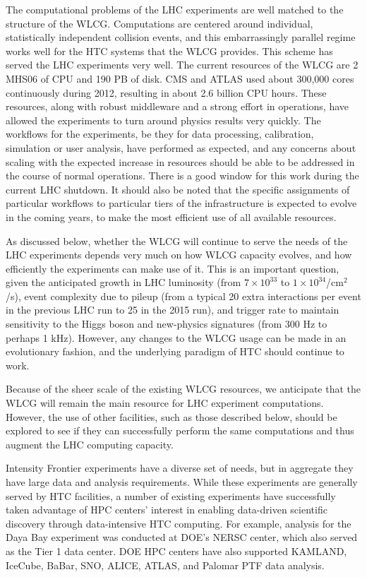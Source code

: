 The computational problems of the LHC experiments are well matched to the structure of the WLCG.  Computations are centered around individual, statistically independent collision events, and this embarrassingly parallel regime works well for the HTC systems that the WLCG provides.  This scheme has served the LHC experiments very well.  The current resources of the WLCG are 2 MHS06 of CPU and 190 PB of disk.  CMS and ATLAS used about 300,000 cores continuously during 2012, resulting in about 2.6 billion CPU hours.  These resources, along with robust middleware and a strong effort in operations, have allowed the experiments to turn around physics results very quickly.  The workflows for the experiments, be they for data processing, calibration, simulation or user analysis, have performed as expected, and any concerns about scaling with the expected increase in resources should be able to be addressed in the course of normal operations.  There is a good window for this work during the current LHC shutdown.  It should also be noted that the specific assignments of particular workflows to particular tiers of the infrastructure is expected to evolve in the coming years, to make the most efficient use of all available resources.

As discussed below, whether the WLCG will continue to serve the needs of the LHC experiments depends very much on how WLCG capacity evolves, and how efficiently the experiments can make use of it.  This is an important question, given the anticipated growth in LHC luminosity (from $7 \times 10^{33}$ to $1 \times 10^{34}$/cm$^2$/s), event complexity due to pileup (from a typical 20 extra interactions per event in the previous LHC run to 25 in the 2015 run), and trigger rate to maintain sensitivity to the Higgs boson and new-physics signatures (from 300 Hz to perhaps 1 kHz).  However, any changes to the WLCG usage can be made in an evolutionary fashion, and the underlying paradigm of HTC should continue to work.

Because of the sheer scale of the existing WLCG resources, we anticipate that the WLCG will remain the main resource for LHC experiment computations.  However, the use of other facilities, such as those described below, should be explored to see if they can successfully perform the same computations and thus augment the LHC computing capacity.

Intensity Frontier experiments have a diverse set of needs, but in aggregate they have large data and analysis requirements. While these experiments are generally served by HTC facilities, a number of existing experiments have successfully taken advantage of HPC centers' interest in enabling data-driven scientific discovery through data-intensive HTC computing.  For example, analysis for the Daya Bay experiment was conducted at DOE's NERSC center, which also served as the Tier 1 data center.  DOE HPC centers have also supported KAMLAND, IceCube, BaBar, SNO, ALICE, ATLAS, and Palomar PTF data analysis.

